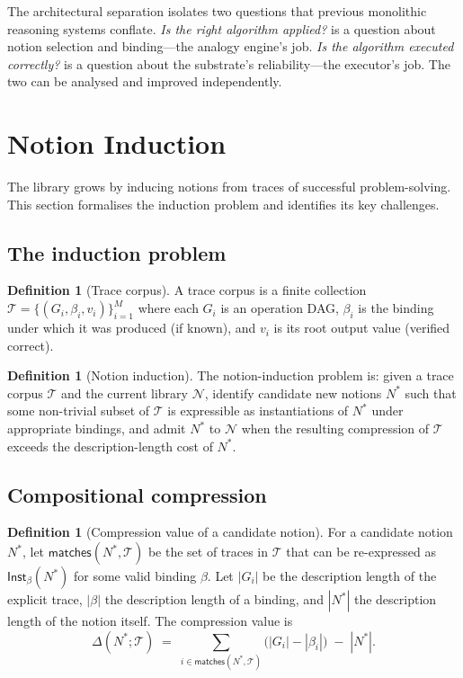 \documentclass[11pt,a4paper]{article}
\theoremstyle{plain}
\theoremstyle{definition}
\newtheorem{definition}[theorem]{Definition}
\theoremstyle{remark}
\newcommand{\Notions}{\mathcal{N}}
\newcommand{\Inst}{\mathsf{Inst}}
\begin{document}
The architectural separation isolates two questions that previous monolithic reasoning systems conflate. \emph{Is the right algorithm applied?} is a question about notion selection and binding---the analogy engine's job. \emph{Is the algorithm executed correctly?} is a question about the substrate's reliability---the executor's job. The two can be analysed and improved independently.

\section{Notion Induction}
\label{sec:induction}

The library grows by inducing notions from traces of successful problem-solving. This section formalises the induction problem and identifies its key challenges.

\subsection{The induction problem}

\begin{definition}[Trace corpus]
\label{def:trace-corpus}
A trace corpus is a finite collection $\mathcal{T} = \{(G_i, \beta_i, v_i)\}_{i=1}^M$ where each $G_i$ is an operation DAG, $\beta_i$ is the binding under which it was produced (if known), and $v_i$ is its root output value (verified correct).
\end{definition}

\begin{definition}[Notion induction]
\label{def:induction}
The notion-induction problem is: given a trace corpus $\mathcal{T}$ and the current library $\Notions$, identify candidate new notions $N^\ast$ such that some non-trivial subset of $\mathcal{T}$ is expressible as instantiations of $N^\ast$ under appropriate bindings, and admit $N^\ast$ to $\Notions$ when the resulting compression of $\mathcal{T}$ exceeds the description-length cost of $N^\ast$.
\end{definition}

\subsection{Compositional compression}

\begin{definition}[Compression value of a candidate notion]
\label{def:compression}
For a candidate notion $N^\ast$, let $\mathsf{matches}(N^\ast, \mathcal{T})$ be the set of traces in $\mathcal{T}$ that can be re-expressed as $\Inst_{\beta}(N^\ast)$ for some valid binding $\beta$. Let $|G_i|$ be the description length of the explicit trace, $|\beta|$ the description length of a binding, and $|N^\ast|$ the description length of the notion itself. The compression value is
\[
\Delta(N^\ast; \mathcal{T}) \;=\; \sum_{i \in \mathsf{matches}(N^\ast, \mathcal{T})} \bigl(|G_i| - |\beta_i|\bigr) \;-\; |N^\ast|.
\]
\end{definition}
\end{document}
